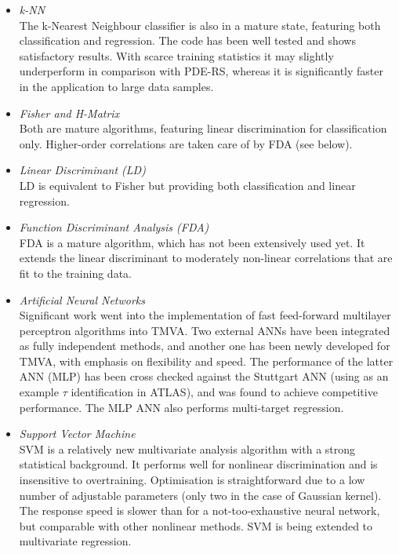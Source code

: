 \begin{itemize}
\item {\em k-NN} \\
      The k-Nearest Neighbour classifier is also in a mature state, featuring
      both classification and regression.
      The code has been well tested and shows satisfactory results. 
      With scarce training statistics it may slightly underperform in comparison
      with PDE-RS, whereas it is significantly faster in the application to large
      data samples.

\item {\em Fisher and H-Matrix}\\
      Both are mature algorithms, featuring linear discrimination for classification 
      only. Higher-order correlations are taken care of by FDA (see below).

\item {\em Linear Discriminant (LD)}\\
      LD is equivalent to Fisher but providing both classification and linear 
      regression.

\item {\em Function Discriminant Analysis (FDA)} \\
      FDA is a mature algorithm, which has not been extensively used yet. It 
      extends the linear discriminant to moderately non-linear correlations that
      are fit to the training data.

\item {\em Artificial Neural Networks} \\
      Significant work went into the 
      implementation of fast feed-forward multilayer perceptron algorithms
      into TMVA. Two external ANNs have been integrated as fully independent
      methods, and another one has been newly developed for TMVA, with emphasis 
      on flexibility and speed. The performance of the latter ANN (MLP) has been 
      cross checked against the Stuttgart ANN (using as an example $\tau$ 
      identification in ATLAS), and was found to achieve competitive performance.
      The MLP ANN also performs multi-target regression.

\item {\em Support Vector Machine}\\
      SVM is a relatively new multivariate analysis algorithm with a strong 
      statistical background. It performs well for nonlinear discrimination 
      and is insensitive to overtraining. Optimisation is 
      straightforward due to a low number of adjustable parameters (only two 
      in the case of Gaussian kernel). The response speed is slower than 
      for a not-too-exhaustive neural network, but comparable with other 
      nonlinear methods. SVM is being extended to multivariate regression.


\end{itemize}
